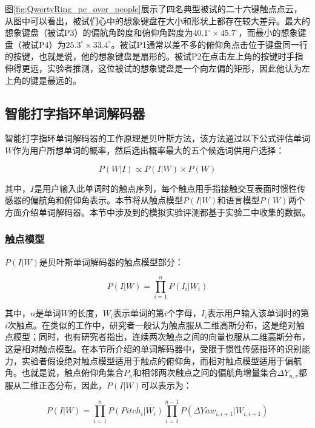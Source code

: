 图\ref{fig:QwertyRing_pc_over_people}展示了四名典型被试的二十六键触点点云，从图中可以看出，被试们心中的想象键盘在大小和形状上都存在较大差异。最大的想象键盘（被试P3）的偏航角跨度和俯仰角跨度为$40.1^\circ \times 45.7^\circ$，而最小的想象键盘（被试P4）为$25.3^\circ \times 33.4^\circ$。被试P1通常以差不多的俯仰角点击位于键盘同一行的按键，也就是说，他的想象键盘是扇形的。被试P2在点击左上角的按键时手指伸得更远，实验者推测，这位被试的想象键盘是一个向左偏的矩形，因此他认为左上角的键是最远的。

\subsection{智能打字指环单词解码器}

智能打字指环单词解码器的工作原理是贝叶斯方法，该方法通过以下公式评估单词$W$作为用户所想单词的概率，然后选出概率最大的五个候选词供用户选择：

\begin{equation}
	P(W|I) \propto P(I|W) \times P(W)
	\label{equ:beyesian}
\end{equation}

其中，$I$是用户输入此单词时的触点序列，每个触点用手指接触交互表面时惯性传感器的偏航角和俯仰角表示。本节将从触点模型$P(I|W)$和语言模型$P(W)$两个方面介绍单词解码器。本节中涉及到的模拟实验评测都基于实验二中收集的数据。

\subsubsection{触点模型}

$P(I|W)$是贝叶斯单词解码器的触点模型部分：

\begin{equation}
	P(I|W) = \prod^{n}_{i=1}P(I_i|W_i)
	\label{equ:beyesian_touch}
\end{equation}

其中，$n$是单词$W$的长度，$W_i$表示单词的第$i$个字母，$I_i$表示用户输入该单词时的第$i$次触点。在类似的工作中，研究者一般认为触点服从二维高斯分布\cite{goodman2002language, azenkot2012touch}，这是绝对触点模型；同时，也有研究者指出，连续两次触点之间的向量也服从二维高斯分布\cite{lu2017blindtype}，这是相对触点模型。在本节所介绍的单词解码器中，受限于惯性传感指环的识别能力，实验者假设绝对触点模型适用于触点的俯仰角，而相对触点模型适用于偏航角。也就是说，触点俯仰角集合$P_u$和相邻两次触点之间的偏航角增量集合$\Delta{Y_{u,v}}$都服从二维正态分布，因此，$P(I|W)$可以表示为：

\begin{equation}
	P(I|W) = \prod^{n}_{i=1}P(Pitch_i|W_i)\prod^{n-1}_{i=1}P(\Delta{Yaw}_{i,i+1}|W_{i,i+1})
	\label{equ:beyesian_relative}
\end{equation}

